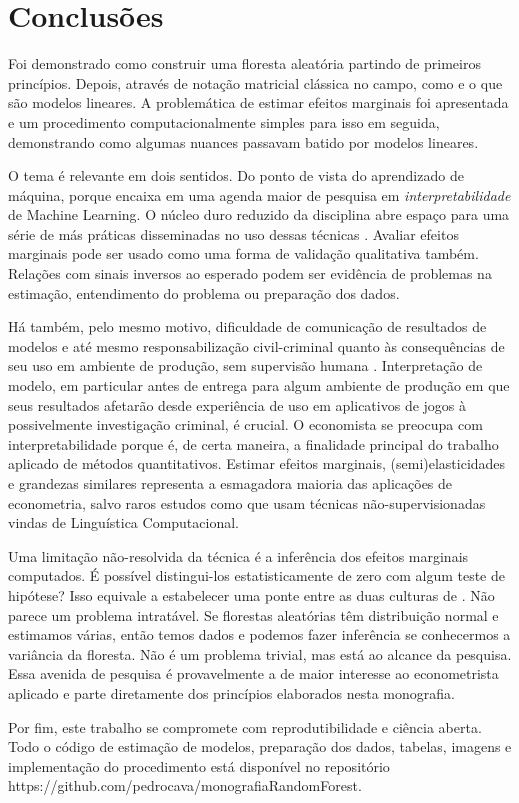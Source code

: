 \chapter{Conclusões}
\label{cap:conclusoes}

Foi demonstrado como construir uma floresta aleatória partindo de primeiros princípios. Depois, através de notação matricial clássica no campo, como e o que são modelos lineares. A problemática de estimar efeitos marginais foi apresentada e um procedimento computacionalmente simples para isso em seguida, demonstrando como algumas nuances passavam batido por modelos lineares.

O tema é relevante em dois sentidos. Do ponto de vista do aprendizado de máquina, porque encaixa em uma agenda maior de pesquisa em \textit{interpretabilidade} de Machine Learning. O núcleo duro reduzido da disciplina abre espaço para uma série de más práticas disseminadas no uso dessas técnicas \cite{flach2019performance}. Avaliar efeitos marginais pode ser usado como uma forma de validação qualitativa também. Relações com sinais inversos ao esperado podem ser evidência de problemas na estimação, entendimento do problema ou preparação dos dados.

Há também, pelo mesmo motivo, dificuldade de comunicação de resultados de modelos e até mesmo responsabilização civil-criminal quanto às consequências de seu uso em ambiente de produção, sem supervisão humana \cite{lepri2018fair}. Interpretação de modelo, em particular antes de entrega para algum ambiente de produção em que seus resultados afetarão desde experiência de uso em aplicativos de jogos à possivelmente investigação criminal, é crucial. O economista se preocupa com interpretabilidade porque é, de certa maneira, a finalidade principal do trabalho aplicado de métodos quantitativos. Estimar efeitos marginais, (semi)elasticidades e grandezas similares representa a esmagadora maioria das aplicações de econometria, salvo raros estudos como  que usam técnicas não-supervisionadas vindas de Linguística Computacional.

Uma limitação não-resolvida da técnica é a inferência dos efeitos marginais computados. É possível distingui-los estatisticamente de zero com algum teste de hipótese? Isso equivale a estabelecer uma ponte entre as duas culturas de . Não parece um problema intratável. Se florestas aleatórias têm distribuição normal e estimamos várias, então temos dados e podemos fazer inferência se conhecermos a variância da floresta. Não é um problema trivial, mas está ao alcance da pesquisa. Essa avenida de pesquisa é provavelmente a de maior interesse ao econometrista aplicado e parte diretamente dos princípios elaborados nesta monografia.

Por fim, este trabalho se compromete com reprodutibilidade e ciência aberta. Todo o código de estimação de modelos, preparação dos dados, tabelas, imagens e implementação do procedimento está disponível no repositório https://github.com/pedrocava/monografiaRandomForest.




